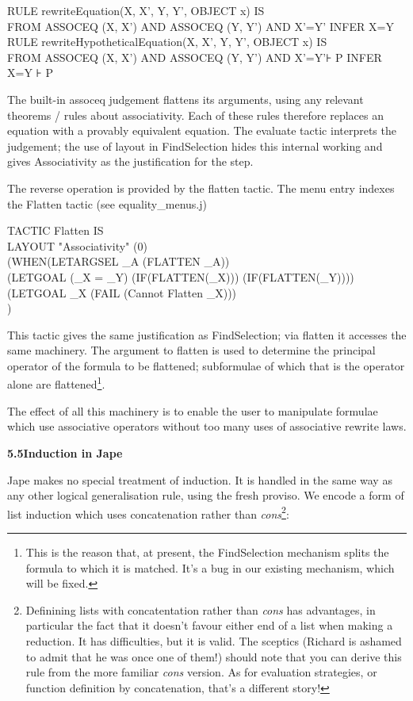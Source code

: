 RULE rewriteEquation(X, X', Y, Y', OBJECT x) IS\\
\tab FROM ASSOCEQ (X, X') AND ASSOCEQ (Y, Y') AND X'=Y' INFER X=Y\\
RULE rewriteHypotheticalEquation(X, X', Y, Y', OBJECT x) IS\\
\tab FROM ASSOCEQ (X, X') AND ASSOCEQ (Y, Y') AND X'=Y'⊦ P INFER X=Y ⊦ P


The built-in assoceq judgement flattens its arguments, using any relevant theorems / rules about associativity. Each of these rules therefore replaces an equation with a provably equivalent equation. The evaluate tactic interprets the judgement; the use of layout in FindSelection hides this internal working and gives Associativity as the justification for the step.


The reverse operation is provided by the flatten tactic. The menu entry indexes the Flatten tactic (see equality\_menus.j)

TACTIC Flatten IS\\
\tab LAYOUT "Associativity" (0)\\
\tab \tab (WHEN\tab (LETARGSEL \_A (FLATTEN \_A))\\
\tab \tab \tab \tab (LETGOAL (\_X = \_Y) (IF(FLATTEN(\_X))) (IF(FLATTEN(\_Y)))) \\
\tab \tab \tab \tab (LETGOAL \_X (FAIL (Cannot Flatten \_X)))\\
\tab \tab )


This tactic gives the same justification as FindSelection; via flatten it accesses the same machinery. The argument to flatten is used to determine the principal operator of the formula to be flattened; subformulae of which that is the operator alone are flattened\footnote{This is the reason that, at present, the FindSelection mechanism splits the formula to which it is matched. It's a bug in our existing mechanism, which will be fixed.}.


The effect of all this machinery is to enable the user to manipulate formulae which use associative operators without too many uses of associative rewrite laws.


\textbf{5.5\tab Induction in Jape}


Jape makes no special treatment of induction. It is handled in the same way as any other logical generalisation rule, using the fresh proviso. We encode a form of list induction which uses concatenation rather than \textit{cons}\footnote{Definining lists with concatentation rather than \textit{cons} has advantages, in particular the fact that it doesn't favour either end of a list when making a reduction. It has difficulties, but it is valid. The sceptics (Richard is ashamed to admit that he was once one of them!) should note that you can derive this rule from the more familiar \textit{cons} version. As for evaluation strategies, or function definition by concatenation, that's a different story!}:



